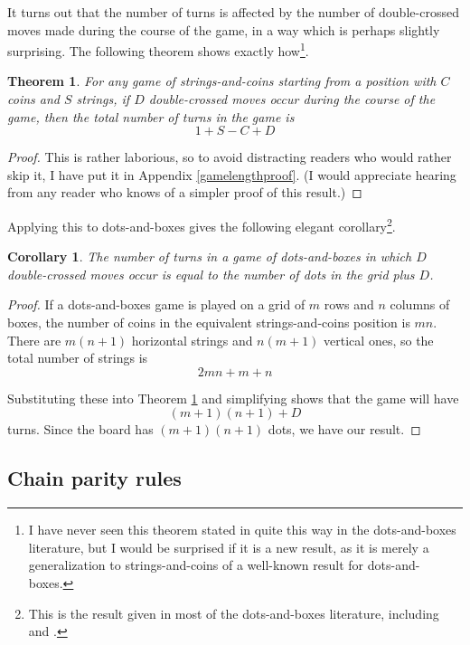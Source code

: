 \documentclass[a4paper,twocolumn]{article}
\newtheorem{gamelength}[thm]{Theorem}
\newtheorem{dnbgamelength}[thm]{Corollary}
\begin{document}
It turns out that the number of turns is affected by the number of
double-crossed moves made during the course of the game, in a way
which is perhaps slightly surprising. The following theorem shows
exactly how\footnote{I have never seen this theorem stated in quite
  this way in the dots-and-boxes literature, but I would be surprised
  if it is a new result, as it is merely a generalization to
  strings-and-coins of a well-known result for dots-and-boxes.}.

\begin{gamelength}\label{gamelength}
  For any game of strings-and-coins starting from a position with $C$
  coins and $S$ strings, if $D$ double-crossed moves occur during
  the course of the game, then the total number of turns in the game
  is $$1 + S - C + D$$
\end{gamelength}
\begin{proof}
  This is rather laborious, so to avoid distracting readers who would
  rather skip it, I have put it in Appendix \ref{gamelengthproof}. (I
  would appreciate hearing from any reader who knows of a simpler
  proof of this result.)
\end{proof}

Applying this to dots-and-boxes gives the following elegant
corollary\footnote{This is the result given in most of the
  dots-and-boxes literature, including \cite{berl} and \cite{wways}.}.

\begin{dnbgamelength}\label{dnbgamelength}
  The number of turns in a game of dots-and-boxes in which $D$
  double-crossed moves occur is equal to the number of dots in the
  grid plus $D$.
\end{dnbgamelength}
\begin{proof}
  If a dots-and-boxes game is played on a grid of $m$ rows and $n$
  columns of boxes, the number of coins in the equivalent
  strings-and-coins position is $mn$. There are $m(n+1)$ horizontal
  strings and $n(m+1)$ vertical ones, so the total number of strings
  is $$2mn + m + n$$

  Substituting these into Theorem \ref{gamelength} and simplifying
  shows that the game will have $$(m+1)(n+1) + D$$ turns.  Since the
  board has $(m+1)(n+1)$ dots, we have our result.
\end{proof}

\subsection{Chain parity rules}
\end{document}
